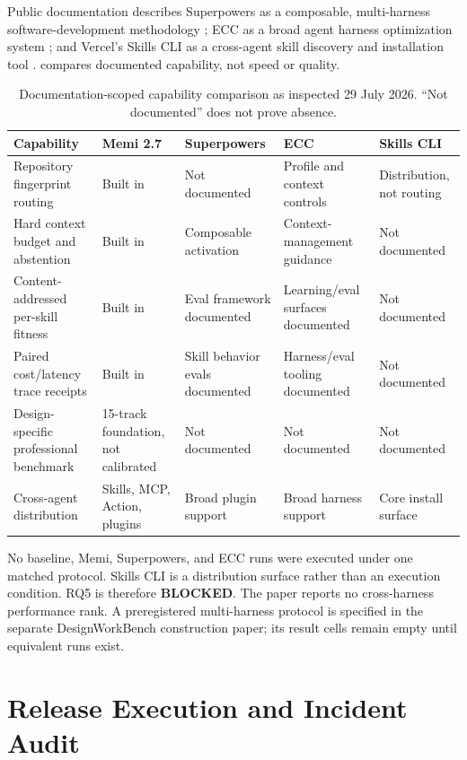 \documentclass[10pt,twocolumn]{article}
\newcommand{\blocked}{\textcolor{MemiRed}{\textbf{BLOCKED}}}
\begin{document}
Public documentation describes Superpowers as a composable, multi-harness
software-development methodology \cite{superpowers2026}; ECC as a broad agent
harness optimization system \cite{ecc2026}; and Vercel's Skills CLI as a
cross-agent skill discovery and installation tool \cite{skillscli2026}.
 compares documented capability, not speed or quality.

\begin{table}[t]
\centering
\caption{Documentation-scoped capability comparison as inspected 29 July 2026.
``Not documented'' does not prove absence.}
\label{tab:landscape}
\small
\begin{tabularx}{\textwidth}{@{}p{}XXXX@{}}
\toprule
Capability & Memi 2.7 & Superpowers & ECC & Skills CLI \\
\midrule
Repository fingerprint routing & Built in & Not documented & Profile and
context controls & Distribution, not routing \\
Hard context budget and abstention & Built in & Composable activation &
Context-management guidance & Not documented \\
Content-addressed per-skill fitness & Built in & Eval framework documented &
Learning/eval surfaces documented & Not documented \\
Paired cost/latency trace receipts & Built in & Skill behavior evals
documented & Harness/eval tooling documented & Not documented \\
Design-specific professional benchmark & 15-track foundation, not calibrated &
Not documented & Not documented & Not documented \\
Cross-agent distribution & Skills, MCP, Action, plugins & Broad plugin support &
Broad harness support & Core install surface \\
\bottomrule
\end{tabularx}
\end{table}

No baseline, Memi, Superpowers, and ECC runs were executed under one matched
protocol. Skills CLI is a distribution surface rather than an execution
condition. RQ5 is therefore \blocked. The paper reports no cross-harness
performance rank. A preregistered multi-harness protocol is specified in the
separate DesignWorkBench construction paper; its result cells remain empty
until equivalent runs exist.

\section{Release Execution and Incident Audit}
\end{document}
